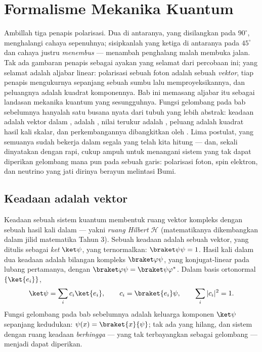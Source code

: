 \chapter{Formalisme Mekanika Kuantum}\label{ch:b3:quantum-formalism}

Ambillah tiga penapis polarisasi. Dua di antaranya, yang disilangkan
pada $90^\circ$, menghalangi cahaya sepenuhnya; sisipkanlah yang ketiga
di antaranya pada $45^\circ$ dan cahaya justru \emph{menembus} ---
menambah penghalang malah membuka jalan. Tak ada gambaran penapis
sebagai ayakan yang selamat dari percobaan ini; yang selamat adalah
aljabar linear: polarisasi sebuah foton adalah sebuah \emph{vektor},
tiap penapis mengukurnya sepanjang sebuah sumbu lalu memproyeksikannya,
dan peluangnya adalah kuadrat komponennya. Bab ini memasang aljabar itu
sebagai landasan mekanika kuantum yang sesungguhnya. Fungsi gelombang
pada bab sebelumnya hanyalah satu busana nyata dari tubuh yang lebih
abstrak: keadaan adalah vektor dalam , 
adalah , nilai terukur adalah , peluang
adalah kuadrat hasil kali skalar, dan perkembangannya dibangkitkan oleh
. Lima postulat, yang semuanya sudah bekerja dalam segala
yang telah kita hitung --- dan, sekali dinyatakan dengan rapi, cukup
ampuh untuk menangani sistem yang tak dapat diperikan gelombang mana pun
pada sebuah garis: polarisasi foton, spin elektron, dan neutrino yang
jati dirinya berayun melintasi Bumi.

\section{Keadaan adalah vektor}

\begin{definition}\label{def:b3:quantum-formalism:state}
Keadaan sebuah sistem kuantum membentuk ruang vektor kompleks dengan
sebuah hasil kali dalam --- yakni \emph{ruang Hilbert} $\mathcal H$
(matematikanya dikembangkan dalam jilid matematika Tahun 3). Sebuah
keadaan adalah sebuah vektor, yang ditulis sebagai \emph{ket}
$\ket\psi$, yang ternormalkan: $\braket\psi\psi = 1$. Hasil kali dalam
dua keadaan adalah bilangan kompleks $\braket\varphi\psi$, yang
konjugat-linear pada lubang pertamanya, dengan
$\braket\varphi\psi = \braket\psi\varphi^*$. Dalam basis ortonormal
$\{\ket{e_i}\}$,
\[
\ket\psi = \sum_i c_i\ket{e_i} , \qquad
c_i = \braket{e_i}\psi , \qquad
\sum_i|c_i|^2 = 1 .
\]
Fungsi gelombang pada bab sebelumnya adalah keluarga komponen
$\ket\psi$ sepanjang kedudukan: $\psi(x) =
\braket{x}{\psi}$; tak ada yang hilang, dan sistem dengan ruang keadaan
\emph{berhingga} --- yang tak terbayangkan sebagai gelombang --- menjadi
dapat diperikan.
\end{definition}

